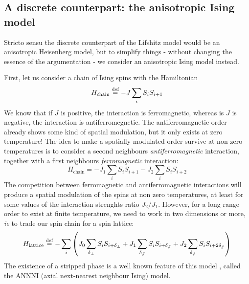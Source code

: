 \subsection{A discrete counterpart: the anisotropic Ising model}

Stricto sensu the discrete counterpart of the Lifshitz model would be an anisotropic Heisenberg model, but to simplify things - without changing the essence of the argumentation - we consider an anisotropic Ising model instead.

First, let us consider a chain of Ising spins with the Hamiltonian
\begin{equation}
H_{\text{chain}}  \overset{\text{def}}{=}  - J \sum_i S_i S_{i+1}
\end{equation}
We know that if $J$ is positive, the interaction is ferromagnetic, whereas is $J$ is negative, the interaction is antiferromegnetic. 
The antiferromagnetic order already shows some kind of spatial modulation, but it only exists at zero temperature! 
The idea to make a spatially modulated order survive at non zero temperatures is to consider a second neighbours \textit{antiferromagnetic} interaction, together with a first neighbours \textit{ferromagnetic} interaction:
\begin{equation}
H_{\text{chain}} = - J_1 \sum_i S_i S_{i+1} - J_2 \sum_i S_i S_{i+2}
\end{equation}
 The competition between ferromagnetic and antiferromagnetic interactions will produce a spatial modulation of the spins at non zero temperatures, at least for some values of the interaction strenghts ratio $J_2/J_1$. However, for a long range order to exist at finite temperature, we need to work in two dimensions or more, \textit{ie} to trade our spin chain for a spin lattice:
 \begin{equation}
 H_{\text{lattice}}  \overset{\text{def}}{=}  - \sum_i \left( J_0 \sum_{\delta_\perp} S_i S_{i+\delta_\perp} + J_1 \sum_{\delta_\sslash} S_i S_{i+\delta_\sslash} + J_2 \sum_{\delta_\sslash} S_i S_{i+2 \delta_\sslash} \right)
 \end{equation}
 The existence of a stripped phase is a well known feature of this model \cite{ANNNI}, called the ANNNI (axial next-nearest neighbour Ising) model.
 
